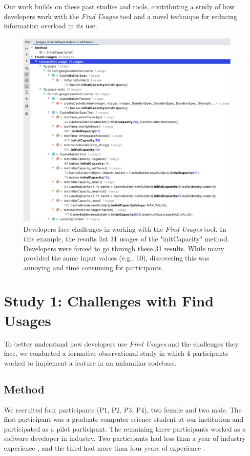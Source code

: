 \documentclass[conference]{IEEEtran}
\providecommand{\DIFadd}[1]{{\protect\color{blue}\uwave{#1}}} %
\providecommand{\DIFaddbegin}{} %
\providecommand{\DIFaddend}{} %
\newcommand{\DIFaddincludegraphics}[2][]{{\color{blue}\fbox{\DIFOincludegraphics[#1]{#2}}}} %
\DeclareRobustCommand{\DIFaddbegin}{\DIFOaddbegin \let\includegraphics\DIFaddincludegraphics} %
\DeclareRobustCommand{\DIFaddend}{\DIFOaddend \let\includegraphics\DIFOincludegraphics} %
\begin{document}
Our work builds on these past studies and tools, contributing a study of how developers work with the \textit{Find Usages} tool and a novel technique for reducing information overload in its use.



\begin{figure}[h]
    \centering
    \includegraphics [width=15cm,height=10cm,keepaspectratio,clip]{figures/challenge}
    \caption{Developers face challenges in working with the \textit{Find Usages} tool. In this example, the results list 31 usages of the "initCapacity" method. Developers were forced to go through these 31 results. 
    While many provided the same input values (e.g., 10), discovering this was annoying and time consuming for participants. 
}
\label{fig:usege}
\end{figure}
\section{Study 1: Challenges with Find Usages}

To better understand how developers use \textit{Find Usages} and the challenges they face, we conducted a formative observational study in which 4 participants worked to implement a feature in an unfamiliar codebase.

\subsection{Method}
We recruited four participants (P1, P2, P3, P4), two female and two male. The first participant \DIFaddbegin \DIFadd{(P1) }\DIFaddend was a graduate computer science student at our institution and participated as a pilot participant. The remaining three participants worked as a software developer in industry. Two participants had less than a year of industry experience \DIFaddbegin \DIFadd{(P2 and P4)}\DIFaddend , and the third had more than four years of experience \DIFaddbegin \DIFadd{(P3)}\DIFaddend .\par 
\end{document}
